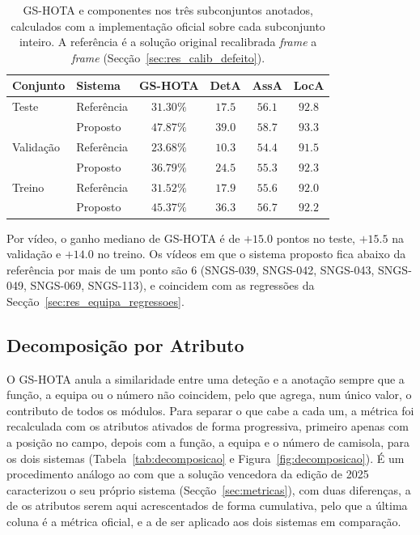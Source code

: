 \begin{table}[htbp]
    \centering
    \caption{GS-HOTA e componentes nos três subconjuntos anotados, calculados com a implementação
    oficial sobre cada subconjunto inteiro. A referência é a solução original recalibrada
    \emph{frame} a \emph{frame} (Secção~\ref{sec:res_calib_defeito}).}
    \label{tab:gshota}
    \begin{tabular}{|l|l|c|c|c|c|}
        \hline
        \textbf{Conjunto} & \textbf{Sistema} & \textbf{GS-HOTA} & \textbf{DetA} & \textbf{AssA} & \textbf{LocA} \\
        \hline
        Teste & Referência & $31.30\%$ & $17.5$ & $56.1$ & $92.8$ \\
        \hline
         & Proposto & $47.87\%$ & $39.0$ & $58.7$ & $93.3$ \\
        \hline
        Validação & Referência & $23.68\%$ & $10.3$ & $54.4$ & $91.5$ \\
        \hline
         & Proposto & $36.79\%$ & $24.5$ & $55.3$ & $92.3$ \\
        \hline
        Treino & Referência & $31.52\%$ & $17.9$ & $55.6$ & $92.0$ \\
        \hline
         & Proposto & $45.37\%$ & $36.3$ & $56.7$ & $92.2$ \\
        \hline
    \end{tabular}
\end{table}

Por vídeo, o ganho mediano de GS-HOTA é de $+15.0$ pontos no teste, $+15.5$ na
validação e $+14.0$ no treino. Os vídeos em que o sistema proposto fica abaixo da referência
por mais de um ponto são 6 (SNGS-039, SNGS-042, SNGS-043, SNGS-049, SNGS-069, SNGS-113), e coincidem com as regressões da
Secção~\ref{sec:res_equipa_regressoes}.

\subsection{Decomposição por Atributo}\label{sec:res_decomposicao}

O GS-HOTA anula a similaridade entre uma deteção e a anotação sempre que a função, a equipa ou o
número não coincidem, pelo que agrega, num único valor, o contributo de todos os módulos. Para
separar o que cabe a cada um, a métrica foi recalculada com os atributos ativados de forma
progressiva, primeiro apenas com a posição no campo, depois com a função, a equipa e o número de
camisola, para os dois sistemas (Tabela~\ref{tab:decomposicao} e Figura~\ref{fig:decomposicao}).
É um procedimento análogo ao com que a solução vencedora da edição de 2025 caracterizou o seu
próprio sistema (Secção~\ref{sec:metricas}), com duas diferenças, a de os atributos serem aqui
acrescentados de forma cumulativa, pelo que a última coluna é a métrica oficial, e a de ser aplicado
aos dois sistemas em comparação.

